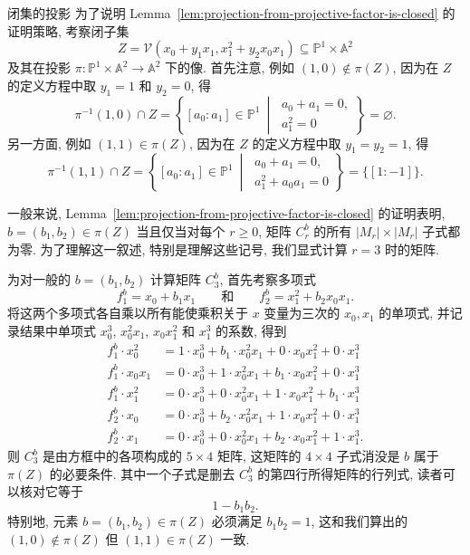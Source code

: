 \begin{Example}{闭集的投影}\leavevmode\label{ex:projecting-closed-set-by-coefficient-matrix}
为了说明 Lemma~\ref{lem:projection-from-projective-factor-is-closed} 的证明策略, 考察闭子集
\[
  Z=\mathcal{V}(x_{0}+y_{1}x_{1},x_{1}^{2}+y_{2}x_{0}x_{1})
  \subseteq\mathbb{P}^{1}\times\mathbb{A}^{2}
\]
及其在投影 $\pi:\mathbb{P}^{1}\times\mathbb{A}^{2}\to\mathbb{A}^{2}$ 下的像. 首先注意, 例如 $(1,0)\notin\pi(Z)$, 因为在 $Z$ 的定义方程中取 $y_{1}=1$ 和 $y_{2}=0$, 得
\[
  \pi^{-1}(1,0)\cap Z
  =\left\{[a_{0}:a_{1}]\in\mathbb{P}^{1}\ \middle|\
    \substack{a_{0}+a_{1}=0,\\ a_{1}^{2}=0}\right\}=\varnothing.
\]
另一方面, 例如 $(1,1)\in\pi(Z)$, 因为在 $Z$ 的定义方程中取 $y_{1}=y_{2}=1$, 得
\[
  \pi^{-1}(1,1)\cap Z
  =\left\{[a_{0}:a_{1}]\in\mathbb{P}^{1}\ \middle|\
    \substack{a_{0}+a_{1}=0,\\a_{1}^{2}+a_{0}a_{1}=0}\right\}=\{[1:-1]\}.
\]

一般来说, Lemma~\ref{lem:projection-from-projective-factor-is-closed} 的证明表明, $b=(b_{1},b_{2})\in\pi(Z)$ 当且仅当对每个 $r\ge0$, 矩阵 $C_{r}^{b}$ 的所有 $|M_{r}|\times|M_{r}|$ 子式都为零. 为了理解这一叙述, 特别是理解这些记号, 我们显式计算 $r=3$ 时的矩阵.

为对一般的 $b=(b_{1},b_{2})$ 计算矩阵 $C_{3}^{b}$, 首先考察多项式
\[
  f_{1}^{b}=x_{0}+b_{1}x_{1}\qquad\text{和}\qquad f_{2}^{b}=x_{1}^{2}+b_{2}x_{0}x_{1}.
\]
将这两个多项式各自乘以所有能使乘积关于 $x$ 变量为三次的 $x_{0},x_{1}$ 的单项式, 并记录结果中单项式 $x_{0}^{3}$, $x_{0}^{2}x_{1}$, $x_{0}x_{1}^{2}$ 和 $x_{1}^{3}$ 的系数, 得到
\[
  \begin{aligned}
  f_{1}^{b}\cdot x_{0}^{2}&=\boxed{1}\cdot x_{0}^{3}+\boxed{b_{1}}\cdot x_{0}^{2}x_{1}
        +\boxed{0}\cdot x_{0}x_{1}^{2}+\boxed{0}\cdot x_{1}^{3}\\
  f_{1}^{b}\cdot x_{0}x_{1}&=\boxed{0}\cdot x_{0}^{3}+\boxed{1}\cdot x_{0}^{2}x_{1}
        +\boxed{b_{1}}\cdot x_{0}x_{1}^{2}+\boxed{0}\cdot x_{1}^{3}\\
  f_{1}^{b}\cdot x_{1}^{2}&=\boxed{0}\cdot x_{0}^{3}+\boxed{0}\cdot x_{0}^{2}x_{1}
        +\boxed{1}\cdot x_{0}x_{1}^{2}+\boxed{b_{1}}\cdot x_{1}^{3}\\
  f_{2}^{b}\cdot x_{0}&=\boxed{0}\cdot x_{0}^{3}+\boxed{b_{2}}\cdot x_{0}^{2}x_{1}
        +\boxed{1}\cdot x_{0}x_{1}^{2}+\boxed{0}\cdot x_{1}^{3}\\
  f_{2}^{b}\cdot x_{1}&=\boxed{0}\cdot x_{0}^{3}+\boxed{0}\cdot x_{0}^{2}x_{1}
        +\boxed{b_{2}}\cdot x_{0}x_{1}^{2}+\boxed{1}\cdot x_{1}^{3}.
  \end{aligned}
\]
则 $C_{3}^{b}$ 是由方框中的各项构成的 $5\times4$ 矩阵, 这矩阵的 $4\times4$ 子式消没是 $b$ 属于 $\pi(Z)$ 的必要条件. 其中一个子式是删去 $C_{3}^{b}$ 的第四行所得矩阵的行列式, 读者可以核对它等于
\[
  1-b_{1}b_{2}.
\]
特别地, 元素 $b=(b_{1},b_{2})\in\pi(Z)$ 必须满足 $b_{1}b_{2}=1$, 这和我们算出的 $(1,0)\notin\pi(Z)$ 但 $(1,1)\in\pi(Z)$ 一致.


\end{Example}
